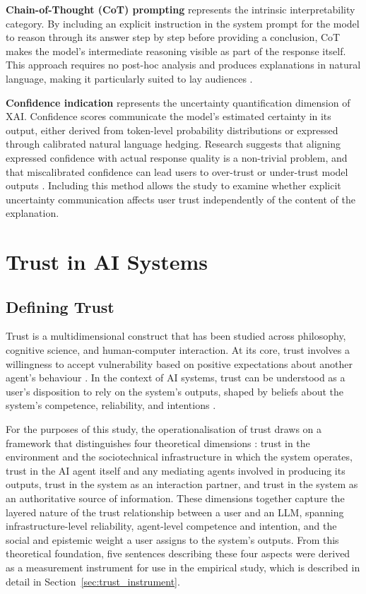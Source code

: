 \textbf{Chain-of-Thought (CoT) prompting} represents the intrinsic interpretability category. By including an explicit instruction in the system prompt for the model to reason through its answer step by step before providing a conclusion, CoT makes the model's intermediate reasoning visible as part of the response itself. This approach requires no post-hoc analysis and produces explanations in natural language, making it particularly suited to lay audiences \cite{wu_usable_2025}.

\textbf{Confidence indication} represents the uncertainty quantification dimension of XAI. Confidence scores communicate the model's estimated certainty in its output, either derived from token-level probability distributions or expressed through calibrated natural language hedging. Research suggests that aligning expressed confidence with actual response quality is a non-trivial problem, and that miscalibrated confidence can lead users to over-trust or under-trust model outputs \cite{tao_when_2024}. Including this method allows the study to examine whether explicit uncertainty communication affects user trust independently of the content of the explanation.

\section{Trust in AI Systems}

\subsection{Defining Trust}
\label{sec:trust_theory}

Trust is a multidimensional construct that has been studied across philosophy, cognitive science, and human-computer interaction. At its core, trust involves a willingness to accept vulnerability based on positive expectations about another agent's behaviour \cite{jones_concept_2002}. In the context of AI systems, trust can be understood as a user's disposition to rely on the system's outputs, shaped by beliefs about the system's competence, reliability, and intentions \cite{falcone_social_2001}.

For the purposes of this study, the operationalisation of trust draws on a framework that distinguishes four theoretical dimensions \cite{jones_concept_2002, falcone_social_2001, castelfranchi_trust_2001}: trust in the environment and the sociotechnical infrastructure in which the system operates, trust in the AI agent itself and any mediating agents involved in producing its outputs, trust in the system as an interaction partner, and trust in the system as an authoritative source of information. These dimensions together capture the layered nature of the trust relationship between a user and an LLM, spanning infrastructure-level reliability, agent-level competence and intention, and the social and epistemic weight a user assigns to the system's outputs. From this theoretical foundation, five sentences describing these four aspects were derived as a measurement instrument for use in the empirical study, which is described in detail in Section~\ref{sec:trust_instrument}.

